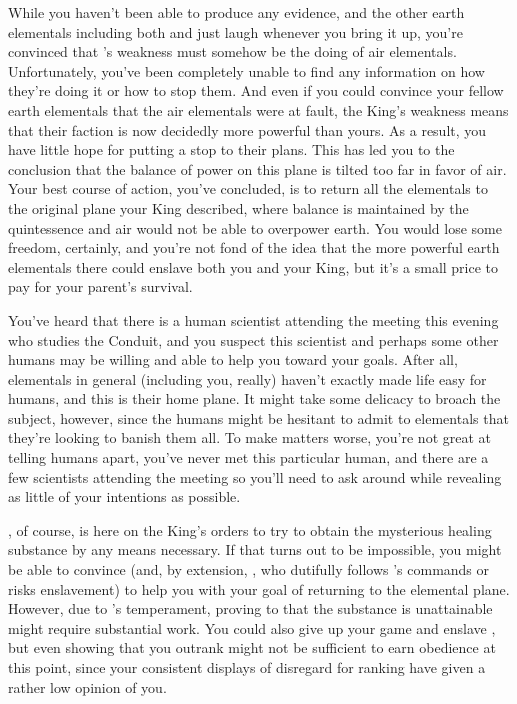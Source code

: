 \documentclass[char]{elementals}
\begin{document}
While you haven't been able to produce any evidence, and the other earth elementals including both \cEarthKing{} and \cLoyal{} just laugh whenever you bring it up, you're convinced that \cEarthKing{}'s weakness must somehow be the doing of air elementals.  Unfortunately, you've been completely unable to find any information on how they're doing it or how to stop them.  And even if you could convince your fellow earth elementals that the air elementals were at fault, the King's weakness means that their faction is now decidedly more powerful than yours.  As a result, you have little hope for putting a stop to their plans.  This has led you to the conclusion that the balance of power on this plane is tilted too far in favor of air.  Your best course of action, you've concluded, is to return all the elementals to the original plane your King described, where balance is maintained by the quintessence and air would not be able to overpower earth.  You would lose some freedom, certainly, and you're not fond of the idea that the more powerful earth elementals there could enslave both you and your King, but it's a small price to pay for your parent's survival.

You've heard that there is a human scientist attending the meeting this evening who studies the Conduit, and you suspect this scientist and perhaps some other humans may be willing and able to help you toward your goals.  After all, elementals in general (including you, really) haven't exactly made life easy for humans, and this is their home plane.  It might take some delicacy to broach the subject, however, since  the humans might be hesitant to admit to elementals that they're looking to banish them all.  To make matters worse, you're not great at telling humans apart, you've never met this particular human, and there are a few scientists attending the meeting so you'll need to ask around while revealing as little of your intentions as possible.

\cLoyal{}, of course, is here on the King's orders to try to obtain the mysterious healing substance by any means necessary.  If that turns out to be impossible, you might be able to convince \cLoyal{\them} (and, by extension, \cMinion{}, who  dutifully follows \cLoyal{}'s commands or risks enslavement) to help you with your goal of returning to the elemental plane.  However, due to \cLoyal{}'s temperament, proving to \cLoyal{\them} that the substance is unattainable might require substantial work.  You could also give up your game and enslave \cLoyal{\them}, but even showing that you outrank \cLoyal{} might not be sufficient to earn \cLoyal{\their} obedience at this point, since your consistent displays of disregard for ranking have given \cLoyal{} a rather low opinion of you.
\end{document}
